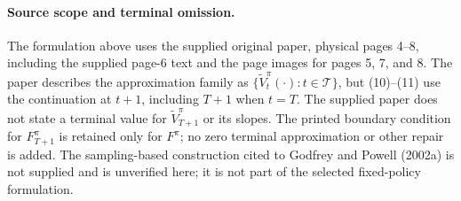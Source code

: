 \documentclass{article}
\begin{document}
\paragraph{Source scope and terminal omission.}
The formulation above uses the supplied original paper, physical pages 4--8, including the supplied page-6 text and the page images for pages 5, 7, and 8. The paper describes the approximation family as $\{\tilde V_t^\pi(\cdot):t\in\mathcal T\}$, but (10)--(11) use the continuation at $t+1$, including $T+1$ when $t=T$. The supplied paper does not state a terminal value for $\tilde V_{T+1}^\pi$ or its slopes. The printed boundary condition for $F_{T+1}^\pi$ is retained only for $F^\pi$; no zero terminal approximation or other repair is added. The sampling-based construction cited to Godfrey and Powell (2002a) is not supplied and is unverified here; it is not part of the selected fixed-policy formulation.
\end{document}
